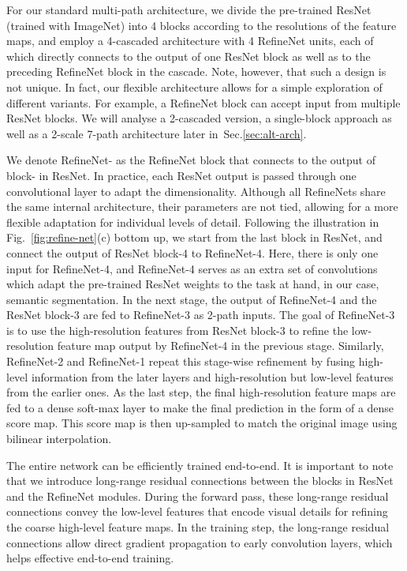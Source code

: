 \documentclass[10pt,twocolumn,letterpaper]{article}
\newcommand{\Fig}{Fig.\xspace}
\newcommand{\Sec}{Sec.\xspace}
\newcommand{\refOurFig}{\ref{fig:refine-net}(c)\xspace}
\begin{document}
For our standard multi-path architecture, we divide the pre-trained ResNet (trained with ImageNet) into 4 blocks according to the resolutions of the feature maps, and employ a 4-cascaded architecture with 4 RefineNet units, each of which directly connects to the output of one ResNet block as well as to the preceding RefineNet block in the cascade. 
Note, however, that such a design is not unique. In fact, our flexible architecture allows for a simple exploration of different variants. For example, a RefineNet block can accept input from multiple ResNet blocks. We will analyse a 2-cascaded version, a single-block approach as well as a 2-scale 7-path architecture later in~\Sec\ref{sec:alt-arch}.

We denote RefineNet- as the RefineNet block that connects to the output of block- in ResNet.
In practice, each ResNet output is passed through one convolutional layer to adapt the dimensionality.
Although all RefineNets share the same internal architecture, their parameters are not tied, allowing for a more flexible adaptation for individual levels of detail.
Following the illustration in \Fig~\refOurFig bottom up, we start from the last block in ResNet, and connect the output of ResNet block-4 to RefineNet-4. Here, there is only one input for RefineNet-4, and RefineNet-4 serves as an extra set of convolutions which adapt the pre-trained ResNet weights to the task at hand, in our case, semantic segmentation.
In the next stage, the output of RefineNet-4 and the ResNet block-3 are fed to RefineNet-3 as 2-path inputs.
The goal of RefineNet-3 is to use the high-resolution features from ResNet block-3 to refine the low-resolution feature map output by RefineNet-4 in the previous stage.
Similarly, RefineNet-2 and RefineNet-1 repeat this stage-wise refinement by fusing high-level information from the later layers and high-resolution but low-level features from the earlier ones. As the last step, the final high-resolution feature maps are fed to a dense soft-max layer to make the final prediction in the form of a dense score map. This score map is then up-sampled to match the original image using bilinear interpolation.

The entire network can be efficiently trained end-to-end. It is important to note that we introduce long-range residual connections between the blocks in ResNet and the RefineNet modules.
During the forward pass, these long-range residual connections convey the low-level features that encode visual details for refining the coarse high-level feature maps.
In the training step, the long-range residual connections allow direct gradient propagation to early convolution layers, which helps effective end-to-end training. 
\end{document}
